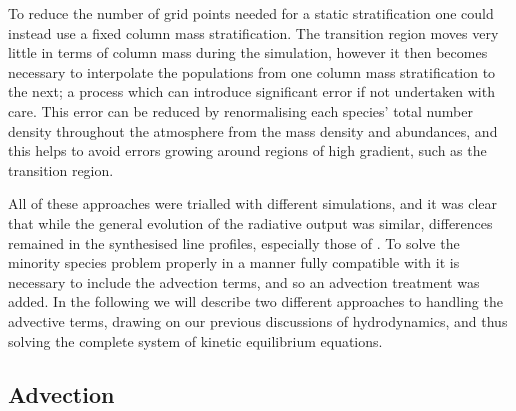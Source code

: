 To reduce the number of grid points needed for a static stratification one could instead use a fixed column mass stratification.
The transition region moves very little in terms of column mass during the simulation, however it then becomes necessary to interpolate the populations from one column mass stratification to the next; a process which can introduce significant error if not undertaken with care.
This error can be reduced by renormalising each species' total number density throughout the atmosphere from the mass density and abundances, and this helps to avoid errors growing around regions of high gradient, such as the transition region.

All of these approaches were trialled with different \Radyn{} simulations, and it was clear that while the general evolution of the radiative output was similar, differences remained in the synthesised line profiles, especially those of \Caii{}.
To solve the minority species problem properly in a manner fully compatible with \Radyn{} it is necessary to include the advection terms, and so an advection treatment was added.
In the following we will describe two different approaches to handling the advective terms, drawing on our previous discussions of hydrodynamics, and thus solving the complete system of kinetic equilibrium equations.

\subsection{Advection}\label{Sec:MsLwAdvection}

